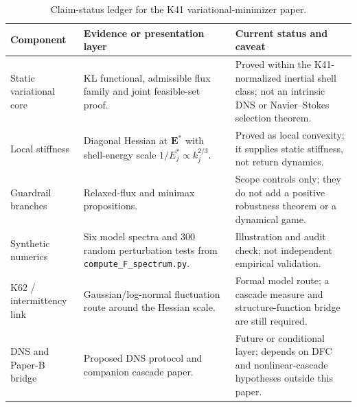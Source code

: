 \documentclass[12pt,a4paper]{article}
\theoremstyle{definition}
\theoremstyle{plain}
\theoremstyle{remark}
\begin{document}
\begin{table}[htbp]
\centering
\small
\setlength{\tabcolsep}{4.5pt}
\renewcommand{\arraystretch}{1.18}
\begin{tabular}{L{0.22\textwidth}L{0.37\textwidth}L{0.35\textwidth}}
\toprule
\textbf{Component} & \textbf{Evidence or presentation layer} & \textbf{Current status and caveat} \\
\midrule
Static variational core & KL functional, admissible flux family and joint feasible-set proof. & Proved within the K41-normalized inertial shell class; not an intrinsic DNS or Navier--Stokes selection theorem. \\
\addlinespace[3pt]
Local stiffness & Diagonal Hessian at $\mathbf{E}^*$ with shell-energy scale $1/E_j^* \propto k_j^{2/3}$. & Proved as local convexity; it supplies static stiffness, not return dynamics. \\
\addlinespace[3pt]
Guardrail branches & Relaxed-flux and minimax propositions. & Scope controls only; they do not add a positive robustness theorem or a dynamical game. \\
\addlinespace[3pt]
Synthetic numerics & Six model spectra and $300$ random perturbation tests from \texttt{compute\_F\_spectrum.py}. & Illustration and audit check; not independent empirical validation. \\
\addlinespace[3pt]
K62 / intermittency link & Gaussian/log-normal fluctuation route around the Hessian scale. & Formal model route; a cascade measure and structure-function bridge are still required. \\
\addlinespace[3pt]
DNS and Paper-B bridge & Proposed DNS protocol and companion cascade paper. & Future or conditional layer; depends on DFC and nonlinear-cascade hypotheses outside this paper. \\
\bottomrule
\end{tabular}
\caption{Claim-status ledger for the K41 variational-minimizer paper.}
\label{tab:claim-status-ledger}
\end{table}
\end{document}
